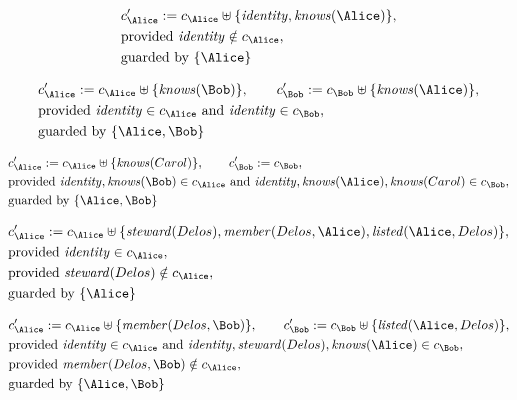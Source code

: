 \begin{align*}
&
c'_
{
\Alice
}
 := 
c_
{
\Alice
}
 \uplus 
\{
\mathit{
identity
}
,
\mathit{
knows
}
(
\Alice
)
\}
,\\
&
\text{provided } 
\mathit{
identity
}
 \notin c_
{
\Alice
}
,\\
&
\text{guarded by } \{
\Alice
\}
\end{align*}

\begin{align*}
&
c'_
{
\Alice
}
 := 
c_
{
\Alice
}
 \uplus 
\{
\mathit{
knows
}
(
\Bob
)
\}
, \qquad 
c'_
{
\Bob
}
 := 
c_
{
\Bob
}
 \uplus 
\{
\mathit{
knows
}
(
\Alice
)
\}
,\\
&
\text{provided } 
\mathit{
identity
}
 \in c_
{
\Alice
}
 \text{ and } 
\mathit{
identity
}
 \in c_
{
\Bob
}
,\\
&
\text{guarded by } \{
\Alice
,
\Bob
\}
\end{align*}

\begin{align*}
&
c'_
{
\Alice
}
 := 
c_
{
\Alice
}
 \uplus 
\{
\mathit{
knows
}
(
Carol
)
\}
, \qquad 
c'_
{
\Bob
}
 := 
c_
{
\Bob
}
,\\
&
\text{provided } 
\mathit{
identity
}
,
\mathit{
knows
}
(
\Bob
)
 \in c_
{
\Alice
}
 \text{ and } 
\mathit{
identity
}
,
\mathit{
knows
}
(
\Alice
)
,
\mathit{
knows
}
(
Carol
)
 \in c_
{
\Bob
}
,\\
&
\text{guarded by } \{
\Alice
,
\Bob
\}
\end{align*}

\begin{align*}
&
c'_
{
\Alice
}
 := 
c_
{
\Alice
}
 \uplus 
\{
\mathit{
steward
}
(
Delos
)
,
\mathit{
member
}
(
Delos
,
\Alice
)
,
\mathit{
listed
}
(
\Alice
,
Delos
)
\}
,\\
&
\text{provided } 
\mathit{
identity
}
 \in c_
{
\Alice
}
,\\
&
\text{provided } 
\mathit{
steward
}
(
Delos
)
 \notin c_
{
\Alice
}
,\\
&
\text{guarded by } \{
\Alice
\}
\end{align*}

\begin{align*}
&
c'_
{
\Alice
}
 := 
c_
{
\Alice
}
 \uplus 
\{
\mathit{
member
}
(
Delos
,
\Bob
)
\}
, \qquad 
c'_
{
\Bob
}
 := 
c_
{
\Bob
}
 \uplus 
\{
\mathit{
listed
}
(
\Alice
,
Delos
)
\}
,\\
&
\text{provided } 
\mathit{
identity
}
 \in c_
{
\Alice
}
 \text{ and } 
\mathit{
identity
}
,
\mathit{
steward
}
(
Delos
)
,
\mathit{
knows
}
(
\Alice
)
 \in c_
{
\Bob
}
,\\
&
\text{provided } 
\mathit{
member
}
(
Delos
,
\Bob
)
 \notin c_
{
\Alice
}
,\\
&
\text{guarded by } \{
\Alice
,
\Bob
\}
\end{align*}
